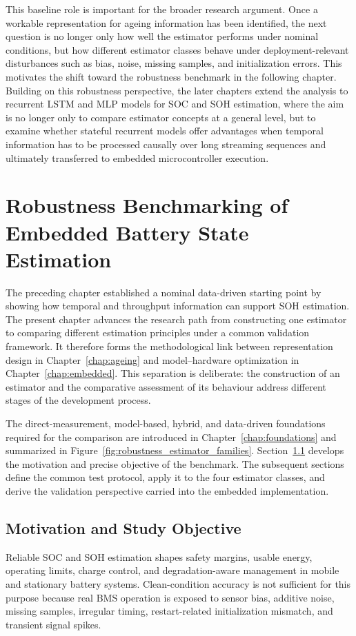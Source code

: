 \documentclass[
    a4paper,
    12pt,
    titlepage,
    bibliography=totoc,
    twoside=on,
    parskip=false,
    numbers=noenddot,
    cleardoublepage=empty,
    DIV=12,
    BCOR=12.0mm,
    headheight=36pt,
    headings=openright
]{scrreprt}
\begin{document}
This baseline role is important for the broader research argument. Once a workable representation for ageing information has been identified, the next question is no longer only how well the estimator performs under nominal conditions, but how different estimator classes behave under deployment-relevant disturbances such as bias, noise, missing samples, and initialization errors. This motivates the shift toward the robustness benchmark in the following chapter. Building on this robustness perspective, the later chapters extend the analysis to recurrent LSTM and MLP models for SOC and SOH estimation, where the aim is no longer only to compare estimator concepts at a general level, but to examine whether stateful recurrent models offer advantages when temporal information has to be processed causally over long streaming sequences and ultimately transferred to embedded microcontroller execution.

\chapter{Robustness Benchmarking of Embedded Battery State Estimation}
\label{chap:robustness}
The preceding chapter established a nominal data-driven starting point by showing how temporal and throughput information can support SOH estimation. The present chapter advances the research path from constructing one estimator to comparing different estimation principles under a common validation framework. It therefore forms the methodological link between representation design in Chapter~\ref{chap:ageing} and model--hardware optimization in Chapter~\ref{chap:embedded}. This separation is deliberate: the construction of an estimator and the comparative assessment of its behaviour address different stages of the development process.

The direct-measurement, model-based, hybrid, and data-driven foundations required for the comparison are introduced in Chapter~\ref{chap:foundations} and summarized in Figure~\ref{fig:robustness_estimator_families}. Section~\ref{sec:robustness_objective} develops the motivation and precise objective of the benchmark. The subsequent sections define the common test protocol, apply it to the four estimator classes, and derive the validation perspective carried into the embedded implementation.

\section{Motivation and Study Objective}
\label{sec:robustness_objective}
Reliable SOC and SOH estimation shapes safety margins, usable energy, operating limits, charge control, and degradation-aware management in mobile and stationary battery systems.\autocite{shrivastavaReviewTechnologicalAdvancement2023,guoSystematicReviewElectrochemical2024,yaoSmarterBatteryManagement2025b} Clean-condition accuracy is not sufficient for this purpose because real BMS operation is exposed to sensor bias, additive noise, missing samples, irregular timing, restart-related initialization mismatch, and transient signal spikes.\autocite{liRobustnessSOCEstimation2015,naseriReliableWirelessBMS2025,bergerBenchmarkingBatteryManagement2024}
\end{document}

